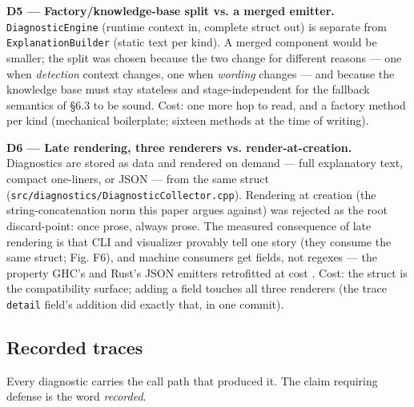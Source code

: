 \textbf{D5 --- Factory/knowledge-base split vs. a merged emitter.}
\texttt{DiagnosticEngine} (runtime context in, complete struct out) is
separate from \texttt{ExplanationBuilder} (static text per kind). A merged
component would be smaller; the split was chosen because the two
change for different reasons --- one when \emph{detection} context changes,
one when \emph{wording} changes --- and because the knowledge base must stay
stateless and stage-independent for the fallback semantics of \S6.3 to
be sound. Cost: one more hop to read, and a factory method per kind
(mechanical boilerplate; sixteen methods at the time of writing).

\textbf{D6 --- Late rendering, three renderers vs. render-at-creation.}
Diagnostics are stored as data and rendered on demand --- full
explanatory text, compact one-liners, or JSON --- from the same struct
(\texttt{src/diagnostics/DiagnosticCollector.cpp}). Rendering at creation
(the string-concatenation norm this paper argues against) was
rejected as the root discard-point: once prose, always prose. The
measured consequence of late rendering is that CLI and visualizer
provably tell one story (they consume the same struct; Fig. F6), and
machine consumers get fields, not regexes --- the property GHC's and
Rust's JSON emitters retrofitted at cost \cite{rustc-json,ghc-structured-errors}. Cost: the struct is the compatibility surface;
adding a field touches all three renderers (the trace \texttt{detail}
field's addition did exactly that, in one commit).

\subsection{Recorded traces}

Every diagnostic carries the call path that produced it. The claim
requiring defense is the word \emph{recorded}.

